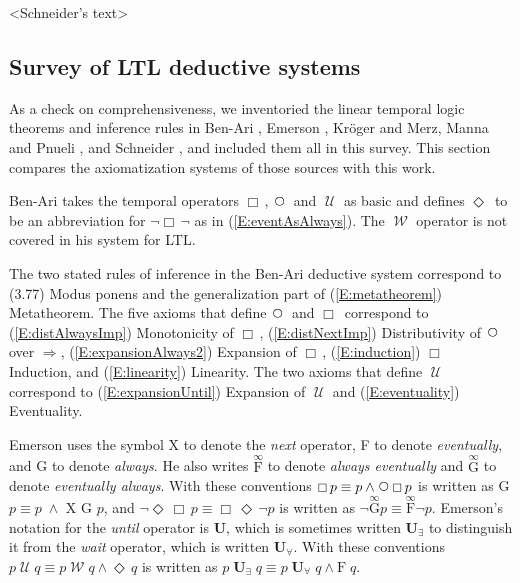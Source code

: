 \documentclass[12pt, fleqn, leqno]{article}
\newcommand{\impl}{\ensuremath{\Rightarrow}}        %
\newcommand{\Until}{\;\mathcal{U}\;}
\newcommand{\Wait}{\;\mathcal{W}\;}
\newcommand{\Next}{\;\,\text{\raisebox{3.5pt}{\circle{6}}}}
\newcommand{\Event}{\Diamond\,}
\newcommand{\Always}{\Box\,}
\newcommand{\all}{\forall}                          %
\newcommand{\ext}{\exists}                          %
\begin{document}
<Schneider's text> \cite{Schn}

\subsection{Survey of LTL deductive systems}\label{section-survey}

As a check on comprehensiveness, we inventoried the linear temporal logic theorems and inference rules in Ben-Ari \cite{Ben}, Emerson \cite{Emer}, Kröger and Merz\cite{Kroger}, Manna and Pnueli \cite{Manna}, and Schneider \cite{Schn}, and included them all in this survey.
This section compares the axiomatization systems of those sources with this work.

Ben-Ari \cite{Ben} takes the temporal operators $\Always$, $\Next$ and $\Until$ as basic and defines $\Event$ to be an abbreviation for $\neg \Always \neg$ as in (\ref{E:eventAsAlways}).
The $\Wait$ operator is not covered in his system for LTL.

The two stated rules of inference in the Ben-Ari deductive system correspond to (3.77) Modus ponens and the generalization part of (\ref{E:metatheorem}) Metatheorem.
The five axioms that define $\Next$ and $\Always$ correspond to (\ref{E:distAlwaysImp}) Monotonicity of $\Always$, (\ref{E:distNextImp}) Distributivity of $\Next$ over $\impl$, (\ref{E:expansionAlways2}) Expansion of $\Always$, (\ref{E:induction}) $\Always$ Induction, and (\ref{E:linearity}) Linearity.
The two axioms that define $\Until$ correspond to (\ref{E:expansionUntil}) Expansion of $\Until$ and (\ref{E:eventuality}) Eventuality.

Emerson \cite{Emer} uses the symbol X to denote the \textit{next} operator, F to denote \textit{eventually}, and G to denote \textit{always}.
He also writes $\overset{\infty}{\textrm{F}}$ to denote \textit{always eventually} and $\overset{\infty}{\textrm{G}}$ to denote \textit{eventually always}.
With these conventions $\Always p \equiv p \land \Next\Always p$ is written as G $p \equiv p \;\land$ X G $p$, and $\neg \Event\Always p \equiv \Always\Event \neg p$ is written as $\neg \overset{\infty}{\textrm{G}} p \equiv \overset{\infty}{\textrm{F}} \neg p$.
Emerson's notation for the \textit{until} operator is $\mathbf{U}$, which is sometimes written $\mathbf{U}_\ext$ to distinguish it from the \textit{wait} operator, which is written $\mathbf{U}_\all$.
With these conventions $p \Until q \equiv p \Wait q\land \Event q$ is written as $p \;\mathbf{U}_\ext \;q \equiv p \;\mathbf{U}_\all \;q\land \textrm{F} \;q$.
\end{document}
